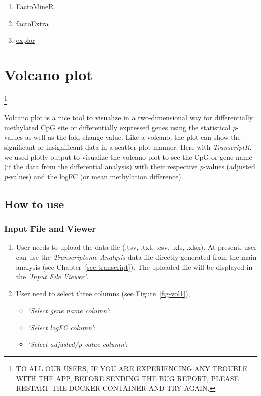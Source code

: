 \documentclass[
  a4paper,
  oneside,
  open=any]{scrreport}
\providecommand{\tightlist}{%
  \setlength{\itemsep}{0pt}\setlength{\parskip}{0pt}}\usepackage{longtable,booktabs,array}
\begin{document}
\begin{enumerate}
\def\labelenumi{\arabic{enumi}.}
\tightlist
\item
  \href{https://cran.r-project.org/web/packages/FactoMineR/FactoMineR.pdf}{FactoMineR}
\item
  \href{https://cran.r-project.org/web/packages/factoextra/factoextra.pdf}{factoExtra}
\item
  \href{https://cran.r-project.org/web/packages/explor/explor.pdf}{explor}
\end{enumerate}

\hypertarget{sec-volcano}{%
\chapter{Volcano plot}\label{sec-volcano}}

\footnote{TO ALL OUR USERS, IF YOU ARE EXPERIENCING ANY TROUBLE WITH THE
  APP, BEFORE SENDING THE BUG REPORT, PLEASE RESTART THE DOCKER
  CONTAINER AND TRY AGAIN.}

Volcano plot is a nice tool to visualize in a two-dimensional way for
differentially methylated CpG site or differentially expressed genes
using the statistical \emph{p}-values as well as the fold change value.
Like a volcano, the plot can show the significant or insignificant data
in a scatter plot manner. Here with \emph{TranscriptR}, we used plotly
output to visualize the volcano plot to see the CpG or gene name (if the
data from the differential analysis) with their respective
\emph{p}-values (adjusted \emph{p}-values) and the logFC (or mean
methylation difference).

\hypertarget{how-to-use-3}{%
\section{How to use}\label{how-to-use-3}}

\hypertarget{input-file-and-viewer}{%
\subsection{Input File and Viewer}\label{input-file-and-viewer}}

\begin{enumerate}
\def\labelenumi{\arabic{enumi}.}
\tightlist
\item
  User needs to upload the data file (.tsv, .txt, .csv, .xls, .xlsx). At
  present, user can use the \emph{Transcriptome Analysis} data file
  directly generated from the main analysis (see
  Chapter~\ref{sec-transcript}). The uploaded file will be displayed in
  the \emph{`Input File Viewer'}.
\item
  User need to select three columns (see Figure~\ref{fig-vol1}),

  \begin{itemize}
  \tightlist
  \item
    \emph{`Select gene name column'}:
  \item
    \emph{`Select logFC column'}:
  \item
    \emph{`Select adjusted/p-value column'}:
  \end{itemize}
\end{enumerate}
\end{document}
